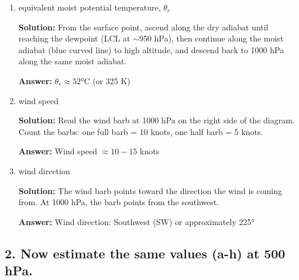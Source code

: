 \documentclass[letterpaper, 11pt]{article}
\newcommand{\1}{\mathds{1}}	%
\theoremstyle{definition}
\begin{document}
\begin{enumerate}[label=(\alph*)]
    \item equivalent moist potential temperature, $\theta_e$
    
    \textbf{Solution:} From the surface point, ascend along the dry adiabat until reaching the dewpoint (LCL at $\sim$950 hPa), then continue along the moist adiabat (blue curved line) to high altitude, and descend back to 1000 hPa along the same moist adiabat.
    
    \textbf{Answer:} $\theta_e \approx 52°\text{C}$ (or 325 K)
    
    \item wind speed 
    
    \textbf{Solution:} Read the wind barb at 1000 hPa on the right side of the diagram. Count the barbs: one full barb = 10 knots, one half barb = 5 knots.
    
    \textbf{Answer:} Wind speed $\approx 10-15$ knots 
    
    \item wind direction
    
    \textbf{Solution:} The wind barb points toward the direction the wind is coming from. At 1000 hPa, the barb points from the southwest.
    
    \textbf{Answer:} Wind direction: Southwest (SW) or approximately 225°
\end{enumerate}

\subsection*{2. Now estimate the same values (a-h) at 500 hPa.}
\end{document}
